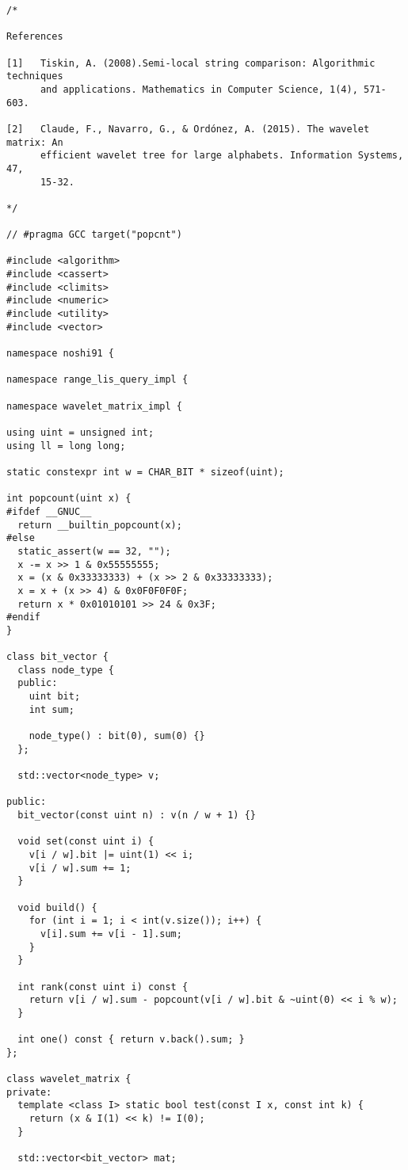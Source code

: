 \documentclass[12pt]{ctexart}
\begin{document}
\begin{lstlisting}
/*

References

[1]   Tiskin, A. (2008).Semi-local string comparison: Algorithmic techniques
      and applications. Mathematics in Computer Science, 1(4), 571-603.

[2]   Claude, F., Navarro, G., & Ordónez, A. (2015). The wavelet matrix: An
      efficient wavelet tree for large alphabets. Information Systems, 47,
      15-32.

*/

// #pragma GCC target("popcnt")

#include <algorithm>
#include <cassert>
#include <climits>
#include <numeric>
#include <utility>
#include <vector>

namespace noshi91 {

namespace range_lis_query_impl {

namespace wavelet_matrix_impl {

using uint = unsigned int;
using ll = long long;

static constexpr int w = CHAR_BIT * sizeof(uint);

int popcount(uint x) {
#ifdef __GNUC__
  return __builtin_popcount(x);
#else
  static_assert(w == 32, "");
  x -= x >> 1 & 0x55555555;
  x = (x & 0x33333333) + (x >> 2 & 0x33333333);
  x = x + (x >> 4) & 0x0F0F0F0F;
  return x * 0x01010101 >> 24 & 0x3F;
#endif
}

class bit_vector {
  class node_type {
  public:
    uint bit;
    int sum;

    node_type() : bit(0), sum(0) {}
  };

  std::vector<node_type> v;

public:
  bit_vector(const uint n) : v(n / w + 1) {}

  void set(const uint i) {
    v[i / w].bit |= uint(1) << i;
    v[i / w].sum += 1;
  }

  void build() {
    for (int i = 1; i < int(v.size()); i++) {
      v[i].sum += v[i - 1].sum;
    }
  }

  int rank(const uint i) const {
    return v[i / w].sum - popcount(v[i / w].bit & ~uint(0) << i % w);
  }

  int one() const { return v.back().sum; }
};

class wavelet_matrix {
private:
  template <class I> static bool test(const I x, const int k) {
    return (x & I(1) << k) != I(0);
  }

  std::vector<bit_vector> mat;


\end{lstlisting}
\end{document}
